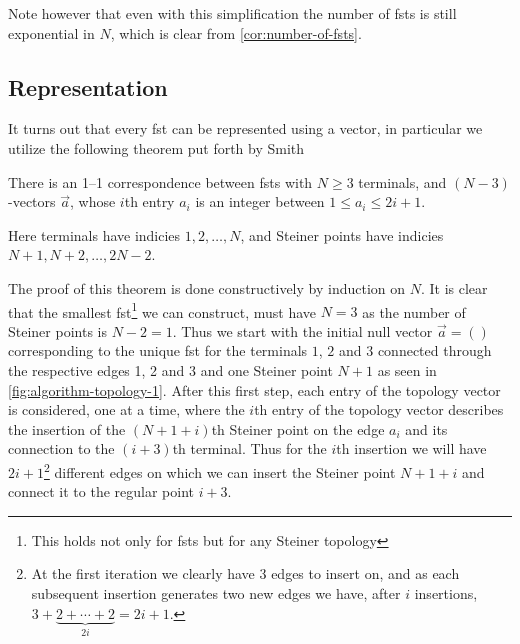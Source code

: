 Note however that even with this simplification the number of \glspl{fst} is
still exponential in $N$, which is clear from \cref{cor:number-of-fsts}.

\subsection{Representation}
\label{sec:representation}

It turns out that every \gls{fst} can be represented using a vector, in
particular we utilize the following theorem put forth by Smith~\cite{smith1992}

\begin{theorem}
  There is an 1--1 correspondence between \glspl{fst} with $N \ge 3$ terminals,
  and $(N-3)$-vectors $\vec{a}$, whose $i$th entry $a_i$ is an integer between
  $1 \le a_i \le 2 i + 1$.
\end{theorem}

Here terminals have indicies $1, 2, \ldots, N$, and Steiner points have indicies
$N+1, N+2, \ldots, 2N-2$.

The proof of this theorem is done constructively by induction on $N$. It is
clear that the smallest \gls{fst}\footnote{This holds not only for \glspl{fst}
  but for any Steiner topology} we can construct, must have $N = 3$ as the
number of Steiner points is $N - 2 = 1$. Thus we start with the initial null
vector $\vec{a} = ()$ corresponding to the unique \gls{fst} for the terminals
$1$, $2$ and $3$ connected through the respective edges 1, 2 and 3 and one
Steiner point $N+1$ as seen in \cref{fig:algorithm-topology-1}. After this
first step, each entry of the topology vector is considered, one at a time,
where the $i$th entry of the topology vector describes the insertion of the
$(N+1+i)$th Steiner point on the edge $a_{i}$ and its connection to the
$(i+3)$th terminal. Thus for the $i$th insertion we will have
$2i+1$\footnote{At the first iteration we clearly have 3 edges to insert on, and
  as each subsequent insertion generates two new edges we have, after $i$
  insertions, $3 + \underbrace{2 + \cdots + 2}_{2 i} = 2 i + 1$.} different
edges on which we can insert the Steiner point $N+1+i$ and connect it to the
regular point $i+3$.

